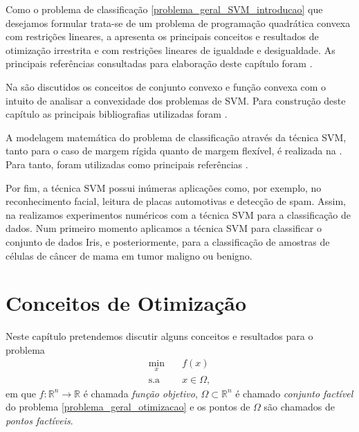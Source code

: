 \documentclass[12pt,a4paper]{scrartcl}
\def\RR{\mathds{R}}
\theoremstyle{definition}%
\begin{document}
Como o problema de classificação \eqref{problema_geral_SVM_introducao} que desejamos formular trata-se de um problema de programação quadrática convexa com restrições lineares, a  apresenta os principais conceitos e resultados de otimização irrestrita e com restrições lineares de igualdade e desigualdade. As principais referências consultadas para elaboração deste capítulo foram \textcite{Ana1994,Ademir2013,Izmailov2014ac,luenberger2008linear}.

Na  são discutidos os conceitos de conjunto convexo e função convexa com o intuito de analisar a convexidade dos problemas de SVM. Para construção deste capítulo as principais bibliografias utilizadas foram \textcite{Ademir2013,Izmailov2014ac,luenberger2008linear,bertsekas2016nonlinear}.

A modelagem matemática do problema de classificação através da técnica SVM, tanto para o caso de margem rígida quanto de margem flexível, é realizada na . Para tanto, foram utilizadas como principais referências \textcite{Evelin2017,Faisal2019}.

Por fim, a técnica SVM possui inúmeras aplicações como, por exemplo, no reconhecimento facial, leitura de placas automotivas e detecção de spam. Assim, na  realizamos experimentos numéricos com a técnica SVM para a classificação de dados. Num primeiro momento aplicamos a técnica SVM para classificar o conjunto de dados Iris, e posteriormente, para a classificação de amostras de células de câncer de mama em tumor maligno ou benigno. 







\newpage
\section{Conceitos de Otimização} \label{chap:conceitos_de_otimizacao}

Neste capítulo pretendemos discutir alguns conceitos e resultados para o problema 
\[ \label{problema_geral_otimizacao}
\begin{aligned}
\min_{x} & \quad f(x) \\
\text{s.a} & \quad x \in \Omega ,
\end{aligned}
\]
em que $f: \RR^{n} \rightarrow \RR$ é chamada \emph{função objetivo}, $\Omega \subset \RR^{n}$ é chamado \emph{conjunto factível} do problema \eqref{problema_geral_otimizacao} e os pontos de $\Omega$ são chamados de \emph{pontos factíveis}. 
\end{document}
